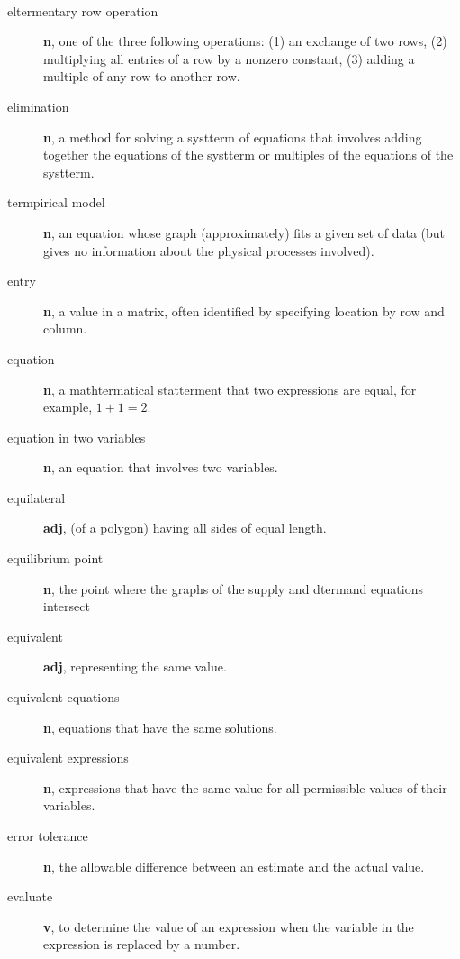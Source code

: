 \documentclass[10pt,]{book}
\newcommand{\terminology}[1]{\textbf{#1}}
\theoremstyle{plain}
\theoremstyle{definition}
\theoremstyle{definition}
\theoremstyle{definition}
\numberwithin{equation}{part}
\begin{document}
\paragraph[{}]{}\hypertarget{paragraphs-9}{}
\leavevmode%
\begin{description}
\item[{eltermentary row operation}]\hypertarget{li-561}{}\terminology{n}, one of the three following operations: (1) an exchange of two rows, (2) multiplying all entries of a row by a nonzero constant, (3) adding a multiple of any row to another row.%
\item[{elimination}]\hypertarget{li-562}{}\terminology{n}, a method for solving a systterm of equations that involves adding together the equations of the systterm or multiples of the equations of the systterm.%
\item[{termpirical model}]\hypertarget{li-563}{}\terminology{n}, an equation whose graph (approximately) fits a given set of data (but gives no information about the physical processes involved).%
\item[{entry}]\hypertarget{li-564}{}\terminology{n}, a value in a matrix, often identified by specifying location by row and column.%
\item[{equation}]\hypertarget{li-565}{}\terminology{n}, a mathtermatical statterment that two expressions are equal, for example, \(1 + 1 = 2\).%
\item[{equation in two variables}]\hypertarget{li-566}{}\terminology{n}, an equation that involves two variables.%
\item[{equilateral}]\hypertarget{li-567}{}\terminology{adj}, (of a polygon) having all sides of equal length.%
\item[{equilibrium point}]\hypertarget{li-568}{}\terminology{n}, the point where the graphs of the supply and dtermand equations intersect%
\item[{equivalent}]\hypertarget{li-569}{}\terminology{adj}, representing the same value.%
\item[{equivalent equations}]\hypertarget{li-570}{}\terminology{n}, equations that have the same solutions.%
\item[{equivalent expressions}]\hypertarget{li-571}{}\terminology{n}, expressions that have the same value for all permissible values of their variables.%
\item[{error tolerance}]\hypertarget{li-572}{}\terminology{n}, the allowable difference between an estimate and the actual value.%
\item[{evaluate}]\hypertarget{li-573}{}\terminology{v}, to determine the value of an expression when the variable in the expression is replaced by a number.%

\end{description}
\end{document}

